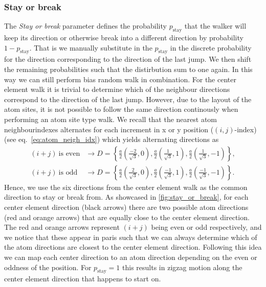 \begin{figure}[H]
     \label{fig:bias_prob}
\end{figure}


\subsubsection{Stay or break}
The \textit{Stay or break} parameter defines the probability $p_{\text{stay}}$ that the walker will keep its direction or otherwise break into a different direction by probability $1-p_{\text{stay}}$. That is we manually substitute in the $p_{\text{stay}}$ in the discrete probability for the direction corresponding to the direction of the last jump. We then shift the remaining probabilities such that the distirbution sum to one again. In this way we can still perform bias random walk in combination. For the center element walk it is trivial to determine which of the neighbour directions correspond to the direction of the last jump. However, due to the layout of the atom sites, it is not possible to follow the same direction continously when performing an atom site type walk. We recall that the nearest atom neighbourindexes alternates for each increment in x or y position ($(i, j)$-index) (see eq.~\eqref{eq:atom_neigh_idx}) which yields alternating directions as
\begin{align*}
  (i + j) \ \text{is even} &\rightarrow D = \left\{ \frac{a}{2}\left(\frac{-2}{\sqrt{3}}, 0\right), \frac{a}{2}\left(\frac{1}{\sqrt{3}}, 1\right), \frac{a}{2}\left(\frac{1}{\sqrt{3}}, -1\right)\right\}, \\
  (i + j) \ \text{is odd} &\rightarrow D = \left\{ \frac{a}{2}\left(\frac{2}{\sqrt{3}}, 0\right), \frac{a}{2}\left(\frac{-1}{\sqrt{3}}, 1\right), \frac{a}{2}\left(\frac{-1}{\sqrt{3}}, -1\right)\right\}.
\end{align*}
Hence, we use the six directions from the center element walk as the common direction to stay or break from. As showcased in \cref{fig:stay_or_break}, for each center element direction (black arrows) there are two possible atom directions (red and orange arrows) that are equally close to the center element direction. The red and orange arrows represent $(i+j)$ being even or odd respectively, and we notice that these appear in paris such that we can always determine which of the atom directions are closest to the center element direction. Following this idea we can map each center direction to an atom direction depending on the even or oddness of the position. For $p_{\text{stay}} = 1$ this results in zigzag motion along the center element direction that happens to start on. 


